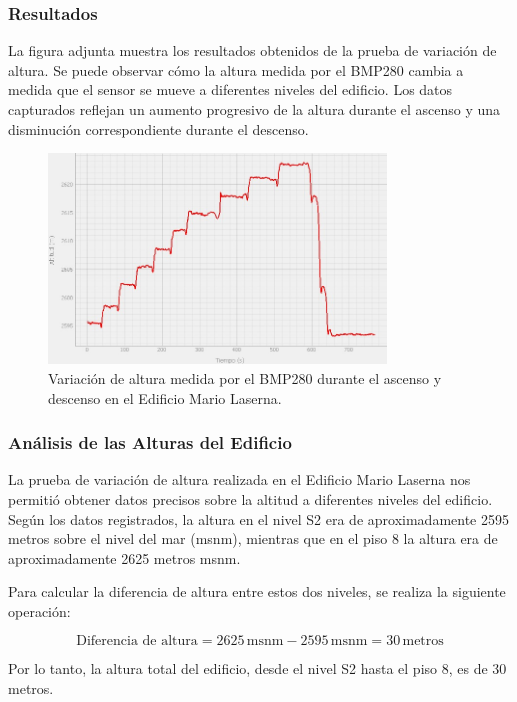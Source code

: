 \subsubsection{Resultados}

La figura adjunta muestra los resultados obtenidos de la prueba de variación de altura. Se puede observar cómo la altura medida por el BMP280 cambia a medida que el sensor se mueve a diferentes niveles del edificio. Los datos capturados reflejan un aumento progresivo de la altura durante el ascenso y una disminución correspondiente durante el descenso.

\begin{figure}[H]
    \centering
    \includegraphics[width=0.8\textwidth]{Imagenes/Pruebas/altura.jpg}
    \caption{Variación de altura medida por el BMP280 durante el ascenso y descenso en el Edificio Mario Laserna.}
    \label{fig:variacion_altura}
\end{figure}

\subsubsection{Análisis de las Alturas del Edificio}

La prueba de variación de altura realizada en el Edificio Mario Laserna nos permitió obtener datos precisos sobre la altitud a diferentes niveles del edificio. Según los datos registrados, la altura en el nivel S2 era de aproximadamente 2595 metros sobre el nivel del mar (msnm), mientras que en el piso 8 la altura era de aproximadamente 2625 metros msnm.

Para calcular la diferencia de altura entre estos dos niveles, se realiza la siguiente operación:

\[
\text{Diferencia de altura} = 2625 \, \text{msnm} - 2595 \, \text{msnm} = 30 \, \text{metros}
\]

Por lo tanto, la altura total del edificio, desde el nivel S2 hasta el piso 8, es de 30 metros.

